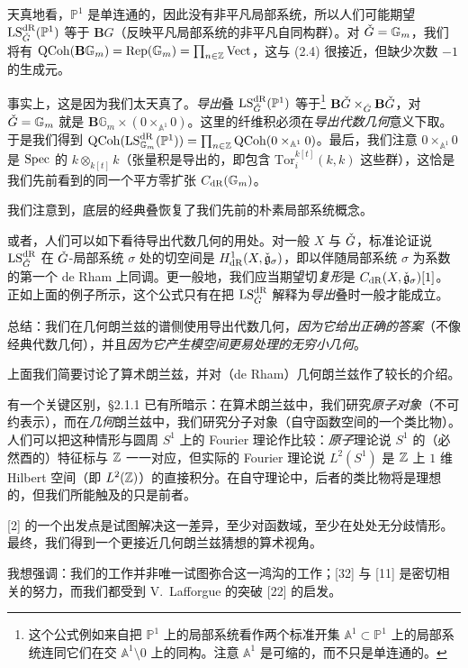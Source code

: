 天真地看，$\mathbb{P}^1$ 是单连通的，因此没有非平凡局部系统，所以人们可能期望 $\mathrm{LS}^{\mathrm{dR}}_{\check{G}}(\mathbb{P}^1)$ 等于 $\mathbf{B}G$（反映平凡局部系统的非平凡自同构群）。对 $\check{G} = \mathbb{G}_m$，我们将有 $\mathrm{QCoh}(\mathbf{B}\mathbb{G}_m) = \mathrm{Rep}(\mathbb{G}_m) = \prod_{n \in \mathbb{Z}} \mathrm{Vect}$，这与 (2.4) 很接近，但缺少次数 $-1$ 的生成元。

事实上，这是因为我们太天真了。\emph{导出}叠 $\mathrm{LS}^{\mathrm{dR}}_{\check{G}}(\mathbb{P}^1)$ 等于\footnote{这个公式例如来自把 $\mathbb{P}^1$ 上的局部系统看作两个标准开集 $\mathbb{A}^1 \subset \mathbb{P}^1$ 上的局部系统连同它们在交 $\mathbb{A}^1 \setminus 0$ 上的同构。注意 $\mathbb{A}^1$ 是可缩的，而不只是单连通的。} $\mathbf{B}\check{G} \times_{\check{G}} \mathbf{B}\check{G}$，对 $\check{G} = \mathbb{G}_m$ 就是 $\mathbf{B}\mathbb{G}_m \times (0 \times_{\mathbb{A}^1} 0)$。这里的纤维积必须在\emph{导出代数几何}意义下取。于是我们得到 $\mathrm{QCoh}(\mathrm{LS}^{\mathrm{dR}}_{\mathbb{G}_m}(\mathbb{P}^1)) = \prod_{n \in \mathbb{Z}} \mathrm{QCoh}(0 \times_{\mathbb{A}^1} 0)$。最后，我们注意 $0 \times_{\mathbb{A}^1} 0$ 是 $\operatorname{Spec}$ 的 $k \otimes_{k[t]} k$（张量积是导出的，即包含 $\mathrm{Tor}^{k[t]}_i(k,k)$ 这些群），这恰是我们先前看到的同一个平方零扩张 $C_{\mathrm{dR}}(\mathbb{G}_m)$。

我们注意到，底层的经典叠恢复了我们先前的朴素局部系统概念。

或者，人们可以如下看待导出代数几何的用处。对一般 $X$ 与 $\check{G}$，标准论证说 $\mathrm{LS}^{\mathrm{dR}}_{\check{G}}$ 在 $\check{G}$-局部系统 $\sigma$ 处的切空间是 $H^1_{\mathrm{dR}}(X, \check{\mathfrak{g}}_\sigma)$，即以伴随局部系统 $\sigma$ 为系数的第一个 de Rham 上同调。更一般地，我们应当期望切\emph{复形}是 $C_{\mathrm{dR}}(X, \check{\mathfrak{g}}_\sigma)[1]$。正如上面的例子所示，这个公式只有在把 $\mathrm{LS}^{\mathrm{dR}}_{\check{G}}$ 解释为\emph{导出}叠时一般才能成立。

总结：我们在几何朗兰兹的谱侧使用导出代数几何，\emph{因为它给出正确的答案}（不像经典代数几何），并且\emph{因为它产生模空间更易处理的无穷小几何}。

 上面我们简要讨论了算术朗兰兹，并对（de Rham）几何朗兰兹作了较长的介绍。

有一个关键区别，§2.1.1 已有所暗示：在算术朗兰兹中，我们研究\emph{原子对象}（不可约表示），而在\emph{几何}朗兰兹中，我们研究分子对象（自守函数空间的一个类比物）。人们可以把这种情形与圆周 $S^1$ 上的 Fourier 理论作比较：\emph{原子}理论说 $S^1$ 的（必然酉的）特征标与 $\mathbb{Z}$ 一一对应，但实际的 Fourier 理论说 $L^2(S^1)$ 是 $\mathbb{Z}$ 上 $1$ 维 Hilbert 空间（即 $L^2(\mathbb{Z})$）的直接积分。在自守理论中，后者的类比物将是理想的，但我们所能触及的只是前者。

[2] 的一个出发点是试图解决这一差异，至少对函数域，至少在处处无分歧情形。最终，我们得到一个更接近几何朗兰兹猜想的算术视角。

我想强调：我们的工作并非唯一试图弥合这一鸿沟的工作；[32] 与 [11] 是密切相关的努力，而我们都受到 V.~Lafforgue 的突破 [22] 的启发。
